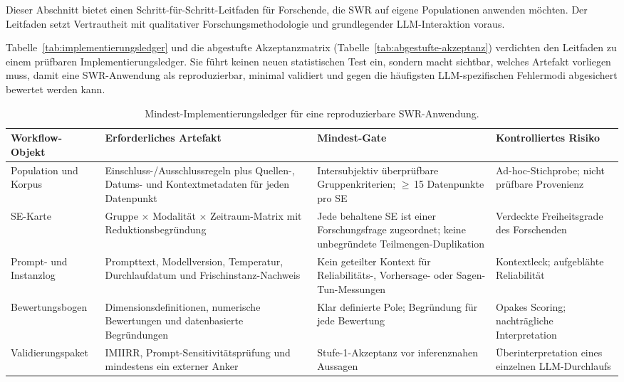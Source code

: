 \documentclass[11pt,a4paper]{article}
\begin{document}
Dieser Abschnitt bietet einen Schritt-für-Schritt-Leitfaden für Forschende, die SWR auf eigene Populationen anwenden möchten. Der Leitfaden setzt Vertrautheit mit qualitativer Forschungsmethodologie und grundlegender LLM-Interaktion voraus.

Tabelle~\ref{tab:implementierungsledger} und die abgestufte Akzeptanzmatrix (Tabelle~\ref{tab:abgestufte-akzeptanz}) verdichten den Leitfaden zu einem prüfbaren Implementierungsledger. Sie führt keinen neuen statistischen Test ein, sondern macht sichtbar, welches Artefakt vorliegen muss, damit eine SWR-Anwendung als reproduzierbar, minimal validiert und gegen die häufigsten LLM-spezifischen Fehlermodi abgesichert bewertet werden kann.

\begin{table}[htbp]
  \centering
  \caption{Mindest-Implementierungsledger für eine reproduzierbare SWR-Anwendung.}
  \label{tab:implementierungsledger}\label{tab:implementation-ledger}
  \scriptsize
  \begin{tabularx}{\textwidth}{@{} L{2.6cm} Y Y Y @{}}
    \toprule
    \textbf{Workflow-Objekt} & \textbf{Erforderliches Artefakt} & \textbf{Mindest-Gate} & \textbf{Kontrolliertes Risiko} \\
    \midrule
    Population und Korpus & Einschluss-/Ausschlussregeln plus Quellen-, Datums- und Kontextmetadaten für jeden Datenpunkt & Intersubjektiv überprüfbare Gruppenkriterien; $\geq$\,15 Datenpunkte pro SE & Ad-hoc-Stichprobe; nicht prüfbare Provenienz \\[3pt]
    SE-Karte & Gruppe $\times$ Modalität $\times$ Zeitraum-Matrix mit Reduktionsbegründung & Jede behaltene SE ist einer Forschungsfrage zugeordnet; keine unbegründete Teilmengen-Duplikation & Verdeckte Freiheitsgrade des Forschenden \\[3pt]
    Prompt- und Instanzlog & Prompttext, Modellversion, Temperatur, Durchlaufdatum und Frischinstanz-Nachweis & Kein geteilter Kontext für Reliabilitäts-, Vorhersage- oder Sagen-Tun-Messungen & Kontextleck; aufgeblähte Reliabilität \\[3pt]
    Bewertungsbogen & Dimensionsdefinitionen, numerische Bewertungen und datenbasierte Begründungen & Klar definierte Pole; Begründung für jede Bewertung & Opakes Scoring; nachträgliche Interpretation \\[3pt]
    Validierungspaket & IMIIRR, Prompt-Sensitivitätsprüfung und mindestens ein externer Anker & Stufe-1-Akzeptanz vor inferenznahen Aussagen & Überinterpretation eines einzelnen LLM-Durchlaufs \\
    \bottomrule
  \end{tabularx}
\end{table}
\end{document}

